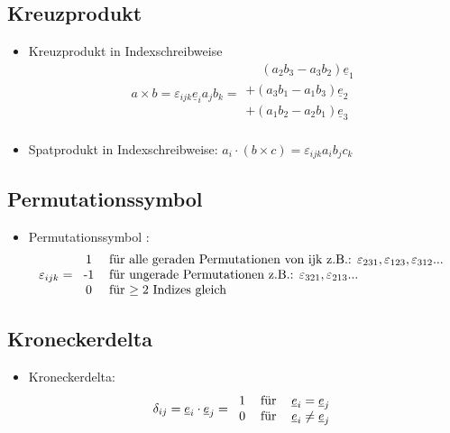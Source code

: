 \documentclass[fleqn,twoside]{article}
\begin{document}
\subsection{Kreuzprodukt}
\begin{itemize}
    \item Kreuzprodukt in Indexschreibweise
        \[ a\times b = \varepsilon_{ijk} \underline{e}_i a_j b_k = \begin{array}{c}  \phantom{+}(a_2b_3-a_3b_2)\underline{e}_1\\
                                                                                                +(a_3b_1-a_1b_3)\underline{e}_2\\
                                                                                                +(a_1b_2-a_2b_1)\underline{e}_3\\
                                                                                                \end{array}  \]
    \item Spatprodukt in Indexschreibweise: $a_i \cdot (b \times c) = \varepsilon_{ijk} a_i b_j c_k$
\end{itemize}
\subsection{Permutationssymbol}
\begin{itemize}
	\item Permutationssymbol :
			\[ \varepsilon_{ijk} =
			\begin{tabular}{c l} 
			1 & für alle geraden Permutationen von ijk {z.B.:} $\varepsilon_{231}, \varepsilon_{123}, \varepsilon_{312}...$\\ 
			-1 & für ungerade Permutationen z.B.: $\varepsilon_{321}, \varepsilon_{213}...$\\  
			0 & für $\geq 2$ Indizes gleich  
			\end{tabular}  	\]
\end{itemize}
\subsection{Kroneckerdelta}
\begin{itemize}
	\item Kroneckerdelta:
			\[ \delta_{ij}=\underline{e}_i \cdot \underline{e}_j=\begin{tabular}{c c l} 1 & für & $\underline{e}_i=\underline{e}_j$ \\ 0 & für &  $\underline{e}_i \neq \underline{e}_j$ \end{tabular} 	\]
\end{itemize}
\end{document}
